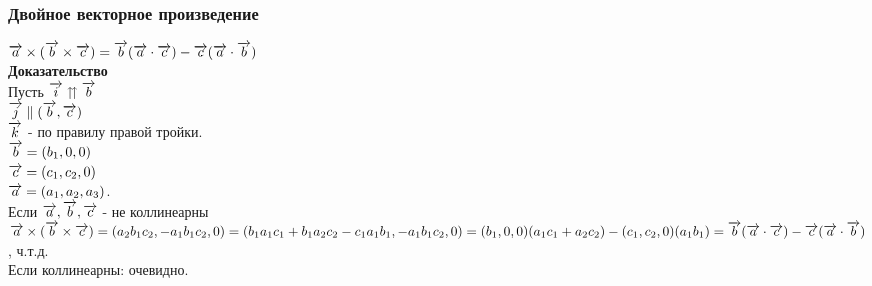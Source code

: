 \documentclass[12pt]{article}
\begin{document}
\subsubsection{Двойное векторное произведение}
$\overrightarrow{a}\times (\overrightarrow{b}\times\overrightarrow{c}) = \overrightarrow{b}(\overrightarrow{a}\cdot\overrightarrow{c})-\overrightarrow{c}(\overrightarrow{a}\cdot\overrightarrow{b})$\\
\textbf{Доказательство}\\
Пусть $\overrightarrow{i} \upuparrows \overrightarrow{b}$\\
$\overrightarrow{j} \parallel (\overrightarrow{b},\overrightarrow{c})$\\
$\overrightarrow{k}$ - по правилу правой тройки.\\
$\overrightarrow{b} = (b_1,0,0)$\\
$\overrightarrow{c} = (c_1, c_2,0)$\\
$\overrightarrow{a} = (a_1,a_2,a_3)$.\\
Если $\overrightarrow{a},\overrightarrow{b},\overrightarrow{c}$ - не коллинеарны\\
$\overrightarrow{a}\times (\overrightarrow{b}\times\overrightarrow{c}) = (a_2b_1c_2,-a_1b_1c_2, 0) = (b_1a_1c_1+b_1a_2c_2-c_1a_1b_1,-a_1b_1c_2,0) = (b_1,0,0)(a_1c_1+a_2c_2)-(c_1,c_2,0)(a_1b_1) = \overrightarrow{b}(\overrightarrow{a}\cdot\overrightarrow{c})-\overrightarrow{c}(\overrightarrow{a}\cdot\overrightarrow{b})$, ч.т.д.\\
Если коллинеарны: очевидно.
\end{document}
